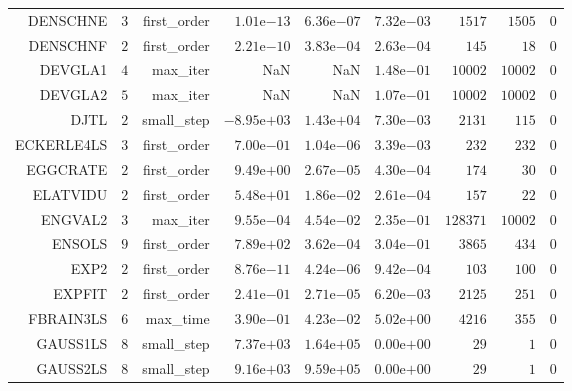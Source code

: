 \begin{longtable}{rrrrrrrrr}
DENSCHNE & \(     3\) & first\_order & \( 1.01\)e\(-13\) & \( 6.36\)e\(-07\) & \( 7.32\)e\(-03\) & \(  1517\) & \(  1505\) & \(     0\) \\
DENSCHNF & \(     2\) & first\_order & \( 2.21\)e\(-10\) & \( 3.83\)e\(-04\) & \( 2.63\)e\(-04\) & \(   145\) & \(    18\) & \(     0\) \\
DEVGLA1 & \(     4\) & max\_iter &       NaN &       NaN & \( 1.48\)e\(-01\) & \( 10002\) & \( 10002\) & \(     0\) \\
DEVGLA2 & \(     5\) & max\_iter &       NaN &       NaN & \( 1.07\)e\(-01\) & \( 10002\) & \( 10002\) & \(     0\) \\
DJTL & \(     2\) & small\_step & \(-8.95\)e\(+03\) & \( 1.43\)e\(+04\) & \( 7.30\)e\(-03\) & \(  2131\) & \(   115\) & \(     0\) \\
ECKERLE4LS & \(     3\) & first\_order & \( 7.00\)e\(-01\) & \( 1.04\)e\(-06\) & \( 3.39\)e\(-03\) & \(   232\) & \(   232\) & \(     0\) \\
EGGCRATE & \(     2\) & first\_order & \( 9.49\)e\(+00\) & \( 2.67\)e\(-05\) & \( 4.30\)e\(-04\) & \(   174\) & \(    30\) & \(     0\) \\
ELATVIDU & \(     2\) & first\_order & \( 5.48\)e\(+01\) & \( 1.86\)e\(-02\) & \( 2.61\)e\(-04\) & \(   157\) & \(    22\) & \(     0\) \\
ENGVAL2 & \(     3\) & max\_iter & \( 9.55\)e\(-04\) & \( 4.54\)e\(-02\) & \( 2.35\)e\(-01\) & \(128371\) & \( 10002\) & \(     0\) \\
ENSOLS & \(     9\) & first\_order & \( 7.89\)e\(+02\) & \( 3.62\)e\(-04\) & \( 3.04\)e\(-01\) & \(  3865\) & \(   434\) & \(     0\) \\
EXP2 & \(     2\) & first\_order & \( 8.76\)e\(-11\) & \( 4.24\)e\(-06\) & \( 9.42\)e\(-04\) & \(   103\) & \(   100\) & \(     0\) \\
EXPFIT & \(     2\) & first\_order & \( 2.41\)e\(-01\) & \( 2.71\)e\(-05\) & \( 6.20\)e\(-03\) & \(  2125\) & \(   251\) & \(     0\) \\
FBRAIN3LS & \(     6\) & max\_time & \( 3.90\)e\(-01\) & \( 4.23\)e\(-02\) & \( 5.02\)e\(+00\) & \(  4216\) & \(   355\) & \(     0\) \\
GAUSS1LS & \(     8\) & small\_step & \( 7.37\)e\(+03\) & \( 1.64\)e\(+05\) & \( 0.00\)e\(+00\) & \(    29\) & \(     1\) & \(     0\) \\
GAUSS2LS & \(     8\) & small\_step & \( 9.16\)e\(+03\) & \( 9.59\)e\(+05\) & \( 0.00\)e\(+00\) & \(    29\) & \(     1\) & \(     0\) \\

\end{longtable}
